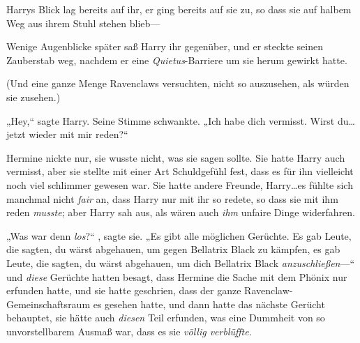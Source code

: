 Harrys Blick lag bereits auf ihr, er ging bereits auf sie zu, so dass sie auf halbem Weg aus ihrem Stuhl stehen blieb—

Wenige Augenblicke später saß Harry ihr gegenüber, und er steckte seinen Zauberstab weg, nachdem er eine \emph{Quietus}-Barriere um sie herum gewirkt hatte.

(Und eine ganze Menge Ravenclaws versuchten, nicht so auszusehen, als würden sie zusehen.)

„Hey,“ sagte Harry. Seine Stimme schwankte. „Ich habe dich vermisst. Wirst du…jetzt wieder mit mir reden?“

Hermine nickte nur, sie wusste nicht, was sie sagen sollte. Sie hatte Harry auch vermisst, aber sie stellte mit einer Art Schuldgefühl fest, dass es für ihn vielleicht noch viel schlimmer gewesen war. Sie hatte andere Freunde, Harry…es fühlte sich manchmal nicht \emph{fair} an, dass Harry nur mit ihr so redete, so dass sie mit ihm reden \emph{musste}; aber Harry sah aus, als wären auch \emph{ihm} unfaire Dinge widerfahren.

„Was war denn \emph{los}?“ , sagte sie. „Es gibt alle möglichen Gerüchte. Es gab Leute, die sagten, du wärst abgehauen, um gegen Bellatrix Black zu kämpfen, es gab Leute, die sagten, du wärst abgehauen, um dich Bellatrix Black \emph{anzuschließen}—“ und \emph{diese} Gerüchte hatten besagt, dass Hermine die Sache mit dem Phönix nur erfunden hatte, und sie hatte geschrien, dass der ganze Ravenclaw-Gemeinschaftsraum es gesehen hatte, und dann hatte das nächste Gerücht behauptet, sie hätte auch \emph{diesen} Teil erfunden, was eine Dummheit von so unvorstellbarem Ausmaß war, dass es sie \emph{völlig verblüffte}.

